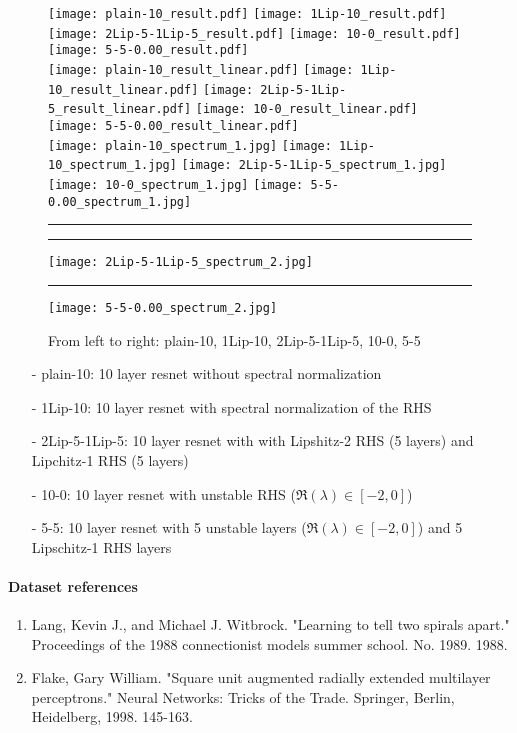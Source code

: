 \documentclass{article}
\begin{document}
\begin{figure}[t]
	\texttt{[image: plain-10\_result.pdf]}
	\texttt{[image: 1Lip-10\_result.pdf]}
	\texttt{[image: 2Lip-5-1Lip-5\_result.pdf]}
	\texttt{[image: 10-0\_result.pdf]}
	\texttt{[image: 5-5-0.00\_result.pdf]}
	\\
	\texttt{[image: plain-10\_result\_linear.pdf]}
	\texttt{[image: 1Lip-10\_result\_linear.pdf]}
	\texttt{[image: 2Lip-5-1Lip-5\_result\_linear.pdf]}
	\texttt{[image: 10-0\_result\_linear.pdf]}
	\texttt{[image: 5-5-0.00\_result\_linear.pdf]}
	\\
	\texttt{[image: plain-10\_spectrum\_1.jpg]}
	\texttt{[image: 1Lip-10\_spectrum\_1.jpg]}
	\texttt{[image: 2Lip-5-1Lip-5\_spectrum\_1.jpg]}
	\texttt{[image: 10-0\_spectrum\_1.jpg]}
	\texttt{[image: 5-5-0.00\_spectrum\_1.jpg]}
	\\
	\rule{0.19\textwidth}{0.1pt}
	\rule{0.19\textwidth}{0.1pt}
	\texttt{[image: 2Lip-5-1Lip-5\_spectrum\_2.jpg]}
	\rule{0.19\textwidth}{0.1pt}
	\texttt{[image: 5-5-0.00\_spectrum\_2.jpg]}
    \caption{From left to right: plain-10, 1Lip-10, 2Lip-5-1Lip-5, 10-0, 5-5}
\end{figure}


\begin{itemize}
	\item[-] plain-10: 10 layer resnet without spectral normalization
	\item[-] 1Lip-10: 10 layer resnet with spectral normalization of the RHS
	\item[-] 2Lip-5-1Lip-5: 10 layer resnet with with Lipshitz-2 RHS (5 layers) and Lipchitz-1 RHS (5 layers)
	\item[-] 10-0: 10 layer resnet with unstable RHS ($\Re(\lambda) \in [-2,0]$)
	\item[-] 5-5: 10 layer resnet with 5 unstable layers ($\Re(\lambda) \in [-2,0]$) and 5 Lipschitz-1 RHS layers
\end{itemize}

\paragraph{Dataset references}
\begin{enumerate}
	\item Lang, Kevin J., and Michael J. Witbrock. "Learning to tell two spirals apart." Proceedings of the 1988 connectionist models summer school. No. 1989. 1988.
	\item Flake, Gary William. "Square unit augmented radially extended multilayer perceptrons." Neural Networks: Tricks of the Trade. Springer, Berlin, Heidelberg, 1998. 145-163.
\end{enumerate}
\end{document}

